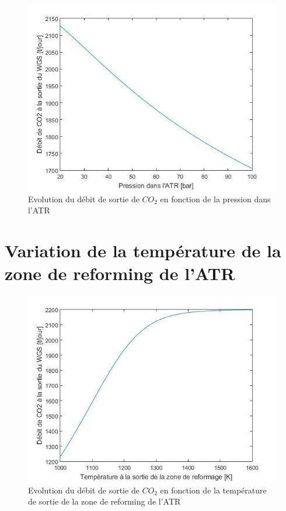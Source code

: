 \documentclass[12pt]{report}
\begin{document}
\begin{figure}[H]
\begin{center}
\includegraphics[scale=0.6]{debit_CO2_pression_ATR}
\caption{Evolution du débit de sortie de $CO_2$ en fonction de la pression dans l'ATR}
\end{center}
\end{figure}
 






\section{Variation de la température de la zone de reforming de l'ATR}

\begin{figure}[H]
\begin{center}
\includegraphics[scale=0.6]{debit_CO2_Temperature}
\caption{Evolution du débit de sortie de $CO_2$ en fonction de la température de sortie de la zone de reforming de l'ATR}
\end{center}
\end{figure}
\end{document}
